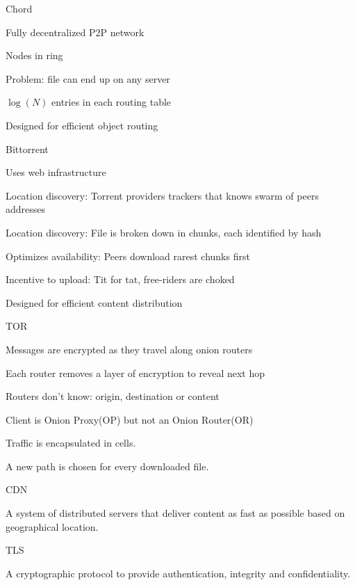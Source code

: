 \documentclass[main.tex]{subfiles}
\begin{document}
\begin{card}{Chord}
\item Fully decentralized P2P network
\item Nodes in ring
\item Problem: file can end up on any server
\item $\log(N)$ entries in each routing table
\item Designed for efficient object routing
\end{card}

\begin{card}{Bittorrent}
\item Uses web infrastructure
\item Location discovery: Torrent providers trackers that knows swarm of peers addresses
\item Location discovery: File is broken down in chunks, each identified by hash
\item Optimizes availability: Peers download rarest chunks first
\item Incentive to upload: Tit for tat, free-riders are choked
\item Designed for efficient content distribution
\end{card}

\begin{card}{TOR}
\item Messages are encrypted as they travel along onion routers
\item Each router removes a layer of encryption to reveal next hop
\item Routers don't know: origin, destination or content
\item Client is Onion Proxy(OP) but not an Onion Router(OR)
\item Traffic is encapsulated in cells.
\item A new path is chosen for every downloaded file.
\end{card}

\begin{card}{CDN}
\item A system of distributed servers that deliver content as fast as possible based on geographical location.
\end{card}

\begin{card}{TLS}
\item A cryptographic protocol to provide authentication, integrity and confidentiality.
\end{card}
\end{document}
